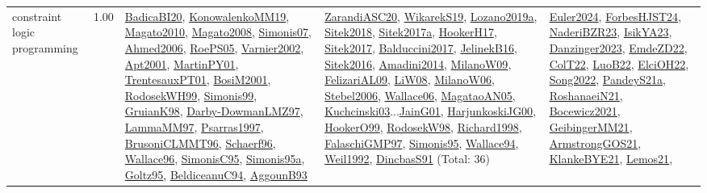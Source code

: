 {\begin{longtable}{p{3cm}r>{\raggedright\arraybackslash}p{6cm}>{\raggedright\arraybackslash}p{6cm}>{\raggedright\arraybackslash}p{8cm}}
\index{constraint logic programming}\index{CP!constraint logic programming}constraint logic programming &  1.00 & \hyperref[detail:BadicaBI20]{BadicaBI20}, \hyperref[detail:KonowalenkoMM19]{KonowalenkoMM19}, \hyperref[detail:Magato2010]{Magato2010}, \hyperref[detail:Magato2008]{Magato2008}, \hyperref[detail:Simonis07]{Simonis07}, \hyperref[detail:Ahmed2006]{Ahmed2006}, \hyperref[detail:RoePS05]{RoePS05}, \hyperref[detail:Varnier2002]{Varnier2002}, \hyperref[detail:Apt2001]{Apt2001}, \hyperref[detail:MartinPY01]{MartinPY01}, \hyperref[detail:TrentesauxPT01]{TrentesauxPT01}, \hyperref[detail:BosiM2001]{BosiM2001}, \hyperref[detail:RodosekWH99]{RodosekWH99}, \hyperref[detail:Simonis99]{Simonis99}, \hyperref[detail:GruianK98]{GruianK98}, \hyperref[detail:Darby-DowmanLMZ97]{Darby-DowmanLMZ97}, \hyperref[detail:LammaMM97]{LammaMM97}, \hyperref[detail:Psarras1997]{Psarras1997}, \hyperref[detail:BrusoniCLMMT96]{BrusoniCLMMT96}, \hyperref[detail:Schaerf96]{Schaerf96}, \hyperref[detail:Wallace96]{Wallace96}, \hyperref[detail:SimonisC95]{SimonisC95}, \hyperref[detail:Simonis95a]{Simonis95a}, \hyperref[detail:Goltz95]{Goltz95}, \hyperref[detail:BeldiceanuC94]{BeldiceanuC94}, \hyperref[detail:AggounB93]{AggounB93} & \hyperref[detail:ZarandiASC20]{ZarandiASC20}, \hyperref[detail:WikarekS19]{WikarekS19}, \hyperref[detail:Lozano2019a]{Lozano2019a}, \hyperref[detail:Sitek2018]{Sitek2018}, \hyperref[detail:Sitek2017a]{Sitek2017a}, \hyperref[detail:HookerH17]{HookerH17}, \hyperref[detail:Sitek2017]{Sitek2017}, \hyperref[detail:Balduccini2017]{Balduccini2017}, \hyperref[detail:JelinekB16]{JelinekB16}, \hyperref[detail:Sitek2016]{Sitek2016}, \hyperref[detail:Amadini2014]{Amadini2014}, \hyperref[detail:MilanoW09]{MilanoW09}, \hyperref[detail:FelizariAL09]{FelizariAL09}, \hyperref[detail:LiW08]{LiW08}, \hyperref[detail:MilanoW06]{MilanoW06}, \hyperref[detail:Stebel2006]{Stebel2006}, \hyperref[detail:Wallace06]{Wallace06}, \hyperref[detail:MagataoAN05]{MagataoAN05}, \hyperref[detail:Kuchcinski03]{Kuchcinski03}...\hyperref[detail:JainG01]{JainG01}, \hyperref[detail:HarjunkoskiJG00]{HarjunkoskiJG00}, \hyperref[detail:HookerO99]{HookerO99}, \hyperref[detail:RodosekW98]{RodosekW98}, \hyperref[detail:Richard1998]{Richard1998}, \hyperref[detail:FalaschiGMP97]{FalaschiGMP97}, \hyperref[detail:Simonis95]{Simonis95}, \hyperref[detail:Wallace94]{Wallace94}, \hyperref[detail:Weil1992]{Weil1992}, \hyperref[detail:DincbasS91]{DincbasS91} (Total: 36) & \hyperref[detail:Euler2024]{Euler2024}, \hyperref[detail:ForbesHJST24]{ForbesHJST24}, \hyperref[detail:NaderiBZR23]{NaderiBZR23}, \hyperref[detail:IsikYA23]{IsikYA23}, \hyperref[detail:Danzinger2023]{Danzinger2023}, \hyperref[detail:EmdeZD22]{EmdeZD22}, \hyperref[detail:ColT22]{ColT22}, \hyperref[detail:LuoB22]{LuoB22}, \hyperref[detail:ElciOH22]{ElciOH22}, \hyperref[detail:Song2022]{Song2022}, \hyperref[detail:PandeyS21a]{PandeyS21a}, \hyperref[detail:RoshanaeiN21]{RoshanaeiN21}, \hyperref[detail:Bocewicz2021]{Bocewicz2021}, \hyperref[detail:GeibingerMM21]{GeibingerMM21}, \hyperref[detail:ArmstrongGOS21]{ArmstrongGOS21}, \hyperref[detail:KlankeBYE21]{KlankeBYE21}, \hyperref[detail:Lemos21]{Lemos21}, 
\end{longtable}}
